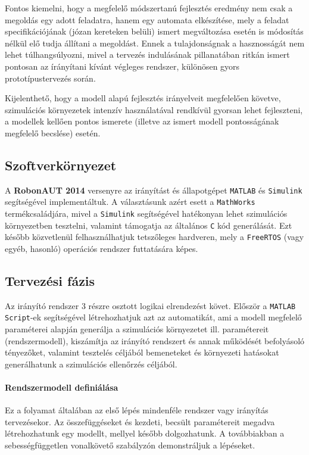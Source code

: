 Fontos kiemelni, hogy a megfelelő módszertanú fejlesztés eredmény nem csak a megoldás egy adott feladatra, hanem egy automata elkészítése, mely a feladat specifikációjának (józan kereteken belüli) ismert megváltozása esetén is módosítás nélkül elő tudja állítani a megoldást. Ennek a tulajdonságnak a hasznosságát nem lehet túlhangsúlyozni, mivel a tervezés indulásának pillanatában ritkán ismert pontosan az írányítani kívánt végleges rendszer, különösen gyors prototípustervezés során.

Kijelenthető, hogy a modell alapú fejlesztés irányelveit megfelelően követve, szimulációs környezetek intenzív használatával rendkívül gyorsan lehet fejleszteni, a modellek kellően pontos ismerete (illetve az ismert modell pontosságának megfelelő becslése) esetén.

\subsection{Szoftverkörnyezet} 

A \textbf{RobonAUT 2014} versenyre az irányítást és állapotgépet \verb!MATLAB! és \verb!Simulink! segítségével implementáltuk. A választásunk azért esett a \verb!MathWorks! termékcsaládjára, mivel a \verb!Simulink! segítségével hatékonyan lehet szimulációs környezetben tesztelni, valamint támogatja az általános \verb!C! kód generálását. Ezt később közvetlenül felhasználhatjuk tetszőleges hardveren, mely a \verb!FreeRTOS! (vagy egyéb, hasonló) operációs rendszer futtatására képes.

\subsection{Tervezési fázis}

Az irányító rendszer 3 részre osztott logikai elrendezést követ. Először a \verb!MATLAB Script!-ek segítségével létrehozhatjuk azt az automatikát, ami a modell megfelelő paraméterei alapján generálja a szimulációs környezetet ill. paramétereit (rendszermodell), kiszámítja az irányító rendszert és annak működését befolyásoló tényezőket, valamint tesztelés céljából bemeneteket és környezeti hatásokat generálhatunk a szimulációs ellenőrzés céljából.

\paragraph{Rendszermodell definiálása}

Ez a folyamat általában az első lépés mindenféle rendszer vagy irányítás tervezésekor. Az összefüggéseket és kezdeti, becsült paramétereit megadva létrehozhatunk egy modellt, mellyel később dolgozhatunk. A továbbiakban a sebességfüggetlen vonalkövető szabályzón demonstráljuk a lépéseket.

